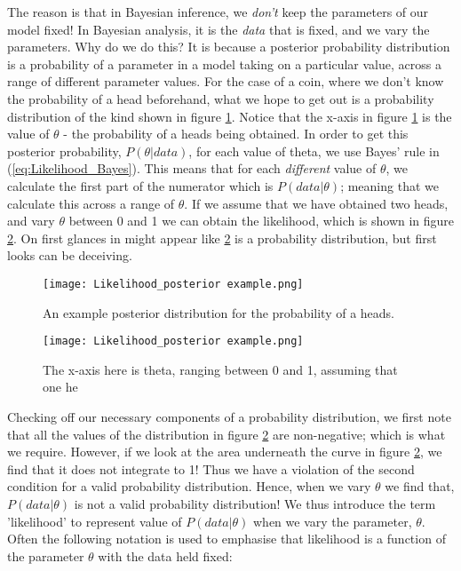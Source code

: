 \documentclass[11pt,fullpage]{book}
\begin{document}
The reason is that in Bayesian inference, we \textit{don't} keep the parameters of our model fixed! In Bayesian analysis, it is the \textit{data} that is fixed, and we vary the parameters. Why do we do this? It is because a posterior probability distribution is a probability of a parameter in a model taking on a particular value, across a range of different parameter values. For the case of a coin, where we don't know the probability of a head beforehand, what we hope to get out is a probability distribution of the kind shown in figure \ref{fig:Likelihood_posteriorExample}. Notice that the x-axis in figure \ref{fig:Likelihood_posteriorExample} is the value of $\theta$ - the probability of a heads being obtained. In order to get this posterior probability, $P(\theta|data)$, for each value of theta, we use Bayes' rule in (\ref{eq:Likelihood_Bayes}). This means that for each \textit{different} value of $\theta$, we calculate the first part of the numerator which is $P(data|\theta)$; meaning that we calculate this across a range of $\theta$. If we assume that we have obtained two heads, and vary $\theta$ between 0 and 1 we can obtain the likelihood, which is shown in figure \ref{fig:Likelihood_coinLikelihood}. On first glances in might appear like \ref{fig:Likelihood_coinLikelihood} is a probability distribution, but first looks can be deceiving. 

\begin{figure}
\centering
\scalebox{0.25} 
{\texttt{[image: Likelihood\_posterior example.png]}}
\caption{An example posterior distribution for the probability of a heads.}\label{fig:Likelihood_posteriorExample}
\end{figure}

\begin{figure}
\centering
\scalebox{0.25} 
{\texttt{[image: Likelihood\_posterior example.png]}}
\caption{The x-axis here is theta, ranging between 0 and 1, assuming that one he}\label{fig:Likelihood_coinLikelihood}
\end{figure}

Checking off our necessary components of a probability distribution, we first note that all the values of the distribution in figure \ref{fig:Likelihood_coinLikelihood} are non-negative; which is what we require. However, if we look at the area underneath the curve in figure \ref{fig:Likelihood_coinLikelihood}, we find that it does not integrate to 1! Thus we have a violation of the second condition for a valid probability distribution. Hence, when we vary $\theta$ we find that, $P(data|\theta)$ is not a valid probability distribution! We thus introduce the term 'likelihood' to represent value of $P(data|\theta)$ when we vary the parameter, $\theta$. Often the following notation is used to emphasise that likelihood is a function of the parameter $\theta$ with the data held fixed:
\end{document}
